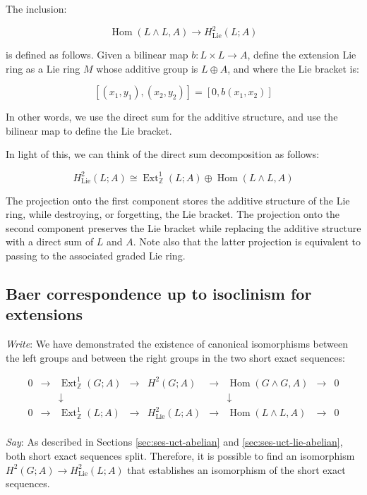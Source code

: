 \documentclass[10pt]{amsart}
\begin{document}
The inclusion:

$$\operatorname{Hom}(L \wedge L,A) \to H^2_{\text{Lie}}(L;A)$$

is defined as follows. Given a bilinear map $b:L \times L \to A$,
define the extension Lie ring as a Lie ring $M$ whose additive group
is $L \oplus A$, and where the Lie bracket is:

$$[(x_1,y_1),(x_2,y_2)] = [0,b(x_1,x_2)]$$

In other words, we use the direct sum for the additive structure, and
use the bilinear map to define the Lie bracket.

In light of this, we can think of the direct sum decomposition as follows:

$$H^2_{\text{Lie}}(L;A) \cong \operatorname{Ext}^1_{\mathbb{Z}}(L;A) \oplus \operatorname{Hom}(L \wedge L,A)$$

The projection onto the first component stores the additive structure
of the Lie ring, while destroying, or forgetting, the Lie bracket. The
projection onto the second component preserves the Lie bracket while
replacing the additive structure with a direct sum of $L$ and
$A$. Note also that the latter projection is equivalent to passing to
the associated graded Lie ring.%

\subsection{Baer correspondence up to isoclinism for extensions}

{\em Write}: We have demonstrated the existence of canonical
isomorphisms between the left groups and between the right groups in
the two short exact sequences:

$$\begin{array}{ccccccccc}
  0 &\to &\operatorname{Ext}^1_{\mathbb{Z}}(G;A) &\to &H^2(G;A) &\to &\operatorname{Hom}(G \wedge G,A) &\to &0\\
  & & \downarrow & & & & \downarrow & & \\
  0 &\to &\operatorname{Ext}^1_{\mathbb{Z}}(L;A) & \to & H^2_{\text{Lie}}(L;A) & \to & \operatorname{Hom}(L \wedge L, A) & \to & 0\\
\end{array}$$

{\em Say}: As described in Sections \ref{sec:ses-uct-abelian} and
\ref{sec:ses-uct-lie-abelian}, both short exact sequences
split. Therefore, it is possible to find an isomorphism $H^2(G;A) \to
H^2_{\text{Lie}}(L;A)$ that establishes an isomorphism of the short
exact sequences.
\end{document}
